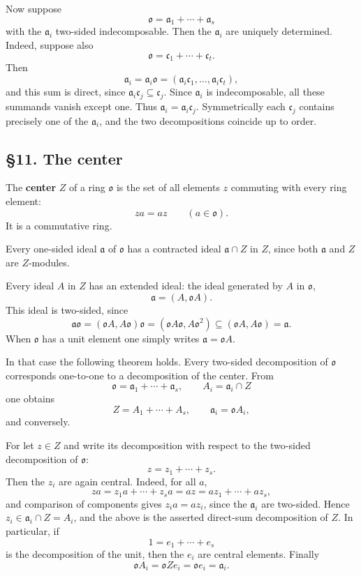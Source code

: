 \documentclass[
  11pt,
]{article}
\begin{document}
Now suppose \[
  \mathfrak{o}=\mathfrak a_1+\cdots+\mathfrak a_s
\] with the \(\mathfrak a_i\) two-sided indecomposable. Then the
\(\mathfrak a_i\) are uniquely determined. Indeed, suppose also \[
  \mathfrak{o}=\mathfrak c_1+\cdots+\mathfrak c_t.
\] Then \[
  \mathfrak a_i=\mathfrak a_i\mathfrak{o}=(\mathfrak a_i\mathfrak c_1,\ldots,\mathfrak a_i\mathfrak c_t),
\] and this sum is direct, since
\(\mathfrak a_i\mathfrak c_j\subseteq \mathfrak c_j\). Since
\(\mathfrak a_i\) is indecomposable, all these summands vanish except
one. Thus \(\mathfrak a_i=\mathfrak a_i\mathfrak c_j\). Symmetrically
each \(\mathfrak c_j\) contains precisely one of the \(\mathfrak a_i\),
and the two decompositions coincide up to order.

\subsection{§11. The center}\label{the-center}

The \textbf{center} \(Z\) of a ring \(\mathfrak{o}\) is the set of all
elements \(z\) commuting with every ring element: \[
  za=az\qquad(a\in\mathfrak{o}).
\] It is a commutative ring.

Every one-sided ideal \(\mathfrak a\) of \(\mathfrak{o}\) has a
contracted ideal \(\mathfrak a\cap Z\) in \(Z\), since both
\(\mathfrak a\) and \(Z\) are \(Z\)-modules.

Every ideal \(A\) in \(Z\) has an extended ideal: the ideal generated by
\(A\) in \(\mathfrak{o}\), \[
  \mathfrak a=(A,\mathfrak{o}A).
\] This ideal is two-sided, since \[
  \mathfrak a\mathfrak{o}=(\mathfrak{o}A,A\mathfrak{o})\mathfrak{o}
      = (\mathfrak{o}A\mathfrak{o},A\mathfrak{o}^2)
      \subseteq (\mathfrak{o}A,A\mathfrak{o})=\mathfrak a.
\] When \(\mathfrak{o}\) has a unit element one simply writes
\(\mathfrak a=\mathfrak{o}A\).

In that case the following theorem holds. Every two-sided decomposition
of \(\mathfrak{o}\) corresponds one-to-one to a decomposition of the
center. From \[
  \mathfrak{o}=\mathfrak a_1+\cdots+\mathfrak a_s,
  \qquad
  A_i=\mathfrak a_i\cap Z
\] one obtains \[
  Z=A_1+\cdots+A_s,
  \qquad
  \mathfrak a_i=\mathfrak{o}A_i,
\] and conversely.

For let \(z\in Z\) and write its decomposition with respect to the
two-sided decomposition of \(\mathfrak{o}\): \[
  z=z_1+\cdots+z_s.
\] Then the \(z_i\) are again central. Indeed, for all \(a\), \[
  za=z_1a+\cdots+z_sa=az=az_1+\cdots+az_s,
\] and comparison of components gives \(z_i a=a z_i\), since the
\(\mathfrak a_i\) are two-sided. Hence
\(z_i\in\mathfrak a_i\cap Z=A_i\), and the above is the asserted
direct-sum decomposition of \(Z\). In particular, if \[
  1=e_1+\cdots+e_s
\] is the decomposition of the unit, then the \(e_i\) are central
elements. Finally \[
  \mathfrak{o}A_i=\mathfrak{o}Ze_i=\mathfrak{o}e_i=\mathfrak a_i.
\]
\end{document}
